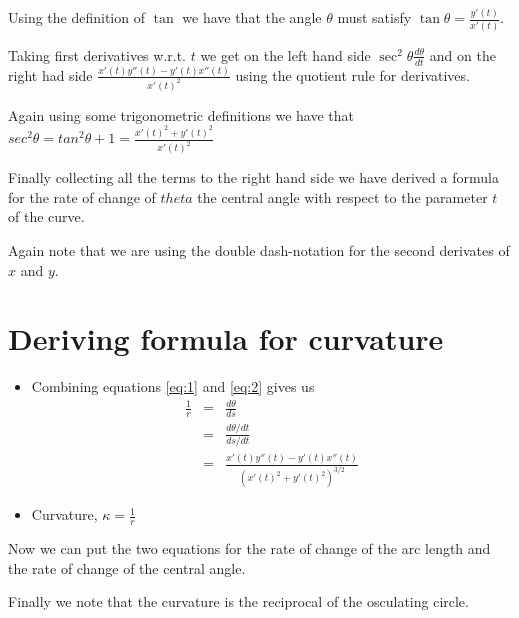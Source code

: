 \documentclass[]{article} %
\theoremstyle{definition}
\theoremstyle{theorem}
\begin{document}
Using the definition of $\tan$ we have that the angle $\theta$ must satisfy  $\tan \theta = \frac{y'(t)}{x'(t)}$.

Taking first derivatives w.r.t. $t$ we get on the left hand side $\sec ^2 \theta \frac{d\theta}{dt}$ and on the right had side $\frac{x'(t) y''(t) - y'(t) x''(t)}{x'(t)^2}$ using the quotient rule for derivatives.

Again using some trigonometric definitions we have that $sec^2\theta = tan^2\theta +1 = \frac{{x'(t)^2+y'(t)^2}}{x'(t)^2}$ 

Finally collecting all the terms to the right hand side we have derived a formula for the rate of change of $theta$ the central angle with respect to the parameter $t$ of the curve.

Again note that we are using the double dash-notation for the second derivates of $x$ and $y$.

\section{Deriving formula for curvature}
\begin{tcolorbox}
	\begin{itemize}
		\item Combining equations \ref{eq:1} and \ref{eq:2} gives us
		\begin{eqnarray*}
			\frac1r &=& \frac{d\theta}{ds} \\
					&=& \frac{d\theta/dt}{ds/dt}  \\
			        &=& \frac{x'(t) y''(t) - y'(t) x''(t)}{\left(x'(t)^2 + y'(t)^2 \right)^{3/2}}
		\end{eqnarray*}	
		\item Curvature, $\kappa = \frac1r$
	\end{itemize}
\end{tcolorbox}

Now we can put the two equations for the rate of change of the arc length and the rate of change of the central angle.

Finally we note that the curvature is the reciprocal of the osculating circle.
\end{document}
